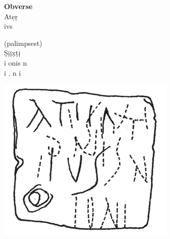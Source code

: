 \documentclass[amsthm,ebook]{saparticle}
\begin{document}
\begin{minipage}[t]{0.25\textwidth}
\textbf{Obverse}\\
At\d{e}\d{r}\\
ivs
\end{minipage}
\begin{minipage}[t]{0.25\textwidth}
(palimpsest)\\
\d{S}\d{i}\d{i}\d{x}\d{t}\d{i}\\
i onis n\\
i . n i 
\end{minipage}
\begin{minipage}[c]{0.30\textwidth}
\includegraphics[width=\columnwidth]{EAGLE16lameetalteaching-img005a.png}
\end{minipage}
\end{document}
